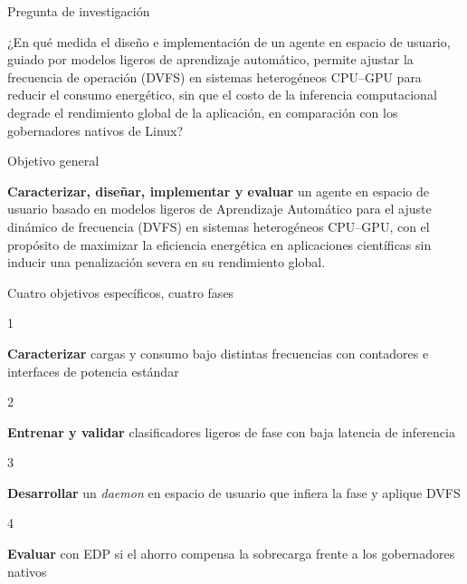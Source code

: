 
\begin{frame}{Pregunta de investigación}
  \vspace{6mm}
  \begin{card}[width=0.9\textwidth,center,fontupper=\small,halign=center,top=4mm,bottom=4mm,left=5mm,right=5mm]
    ¿En qué medida el diseño e implementación de un agente en espacio de usuario,
    guiado por modelos ligeros de aprendizaje automático, permite ajustar la
    frecuencia de operación (DVFS) en sistemas heterogéneos CPU--GPU para reducir
    el consumo energético, sin que el costo de la inferencia computacional degrade
    el rendimiento global de la aplicación, en comparación con los gobernadores
    nativos de Linux?
  \end{card}
\end{frame}

\begin{frame}{Objetivo general}
  \vspace{6mm}
  \begin{card}[width=0.9\textwidth,center,fontupper=\small,halign=center,top=4mm,bottom=4mm,left=5mm,right=5mm]
    \textbf{Caracterizar, diseñar, implementar y evaluar} un agente en espacio de
    usuario basado en modelos ligeros de Aprendizaje Automático para el ajuste
    dinámico de frecuencia (DVFS) en sistemas heterogéneos CPU--GPU, con el
    propósito de maximizar la eficiencia energética en aplicaciones científicas
    sin inducir una penalización severa en su rendimiento global.
  \end{card}
\end{frame}

\newcommand{\oecard}[2]{%
  \begin{minipage}[t]{0.235\textwidth}
    \begin{tcolorbox}[uisbase,colback=uisgreen,fontupper=\small\bfseries\color{white},halign=center,
      sharp corners=south,bottom=1mm,top=1mm]#1\end{tcolorbox}\vspace{-2.2mm}
    \begin{card}[sharp corners=north,height=27mm,halign=center,fontupper=\footnotesize]#2\end{card}
  \end{minipage}}

\begin{frame}{Cuatro objetivos específicos, cuatro fases}
  \vspace{4mm}
  \oecard{1}{\textbf{Caracterizar} cargas y consumo bajo distintas frecuencias con contadores e interfaces de potencia estándar}\hfill
  \oecard{2}{\textbf{Entrenar y validar} clasificadores ligeros de fase con baja latencia de inferencia}\hfill
  \oecard{3}{\textbf{Desarrollar} un \textit{daemon} en espacio de usuario que infiera la fase y aplique DVFS}\hfill
  \oecard{4}{\textbf{Evaluar} con EDP si el ahorro compensa la sobrecarga frente a los gobernadores nativos}
\end{frame}
